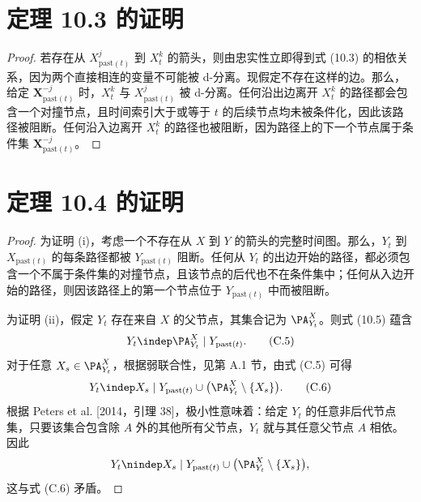 \section{定理 10.3 的证明}
\begin{proof}
若存在从 $X_{\mathrm{past}(t)}^j$ 到 $X_t^k$ 的箭头，则由忠实性立即得到式 (10.3) 的相依关系，因为两个直接相连的变量不可能被 d-分离。现假定不存在这样的边。那么，给定 $\mathbf X_{\mathrm{past}(t)}^{-j}$ 时，$X_t^k$ 与 $X_{\mathrm{past}(t)}^j$ 被 d-分离。任何沿出边离开 $X_t^k$ 的路径都会包含一个对撞节点，且时间索引大于或等于 $t$ 的后续节点均未被条件化，因此该路径被阻断。任何沿入边离开 $X_t^k$ 的路径也被阻断，因为路径上的下一个节点属于条件集 $\mathbf X_{\mathrm{past}(t)}^{-j}$。
\end{proof}

\section{定理 10.4 的证明}
\begin{proof}
为证明 (i)，考虑一个不存在从 $X$ 到 $Y$ 的箭头的完整时间图。那么，$Y_t$ 到 $X_{\mathrm{past}(t)}$ 的每条路径都被 $Y_{\mathrm{past}(t)}$ 阻断。任何从 $Y_t$ 的出边开始的路径，都必须包含一个不属于条件集的对撞节点，且该节点的后代也不在条件集中；任何从入边开始的路径，则因该路径上的第一个节点位于 $Y_{\mathrm{past}(t)}$ 中而被阻断。

为证明 (ii)，假定 $Y_t$ 存在来自 $X$ 的父节点，其集合记为 $\PA_{Y_t}^X$。则式 (10.5) 蕴含
\begin{equation}Y_t\indep\PA_{Y_t}^X\mid Y_{\mathrm{past}(t)}.\tag{C.5}\end{equation}
对于任意 $X_s\in\PA_{Y_t}^X$，根据弱联合性，见第 A.1 节，由式 (C.5) 可得
\begin{equation}
Y_t\indep X_s\mid Y_{\mathrm{past}(t)}\cup\big(\PA_{Y_t}^X\setminus\{X_s\}\big).
\tag{C.6}
\end{equation}
根据 Peters et al. [2014，引理 38]，极小性意味着：给定 $Y_t$ 的任意非后代节点集，只要该集合包含除 $A$ 外的其他所有父节点，$Y_t$ 就与其任意父节点 $A$ 相依。因此
\[Y_t\nindep X_s\mid Y_{\mathrm{past}(t)}\cup\big(\PA_{Y_t}^X\setminus\{X_s\}\big),\]
这与式 (C.6) 矛盾。
\end{proof}

